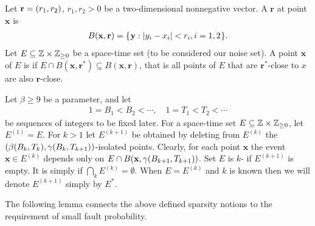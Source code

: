 \documentclass[11pt]{memoir}
\theoremstyle{definition} %
\renewcommand{\ge}{\geq}
\renewcommand{\vek}[1]{\mathbf{#1}}
\def\B{B}
\newcommand{\Tu}{T}
\renewcommand{\r}{\vek{r}} %
\newcommand{\x}{\vek{x}} %
\newcommand{\y}{\vek{y}} %
\begin{document}
\begin{definition}
Let \( \r=\pair{r_{1}}{r_{2}} \), \( r_{1}, r_{2}> 0 \)
be a two-dimensional nonnegative vector.
A  \( \r  \)  at point  \( \x \) is
\begin{align}\label{eq:ball1}
  B(\x,\r) = \setOf{\y}{\abs{y_{i} - x_{i}} < r_{i}, i=1,2}.
\end{align}  
Let \( E\subseteq \bbZ\times\bbZ_{\ge 0} \) be a space-time set (to be considered our noise set).
A point \( \x \) of \( E \) is \df{\( \pair{\r}{\r^{*}} \)-isolated} if
\(  E \cap B(\x,\r^{*})\subseteq B(\x, \r)  \),
 that is all points of \( E \) that are \( \r^{*} \)-close to \( x \) are also \( \r \)-close.
\end{definition}

\begin{definition}\label{def:sparsity}
  Let \( \beta\ge 9 \) be a parameter, and let
  \begin{align*}
  1=\B_{1}<\B_{2}<\dotsm,\quad
  1=\Tu_{1}<\Tu_{2}<\dotsm
\end{align*}
be sequences of integers to be fixed later.
For a space-time set \( E\subseteq\bbZ\times\bbZ_{\ge 0} \), let \( E^{(1)} = E \).
For \( k>1 \) let \( E^{(k+1)} \) be obtained by deleting from \( E^{(k)} \) the
\( \pair{\beta\pair{\B_{k}}{\Tu_{k}}}{\gamma\pair{\B_{k}}{\Tu_{k+1}}} \)-isolated points.
Clearly, for each point \( \x \) the event \( \x\in E^{(k)} \) depends only on
  \( E\cap B(\x,\gamma\pair{\B_{k+1}}{\Tu_{k+1}}) \).
Set \( E \) is \( k \)- if \( E^{(k+1)} \) is empty.
It is simply  if \( \bigcap_{k}E^{(k)}=\emptyset \).
When \( E=E^{(k)} \) and \( k \) is known
then we will denote \( E^{(k+1)} \) simply by \( E^{*} \).
\end{definition}

The following lemma connects the above defined sparsity notions to the requirement
of small fault probability.
\end{document}
